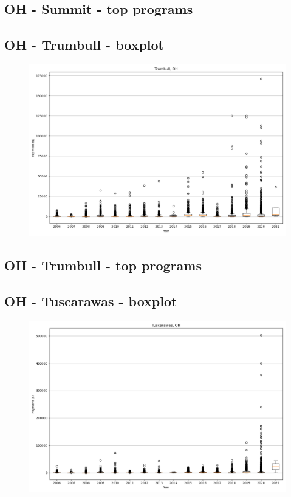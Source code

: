 \subsection*{OH - Summit - top programs}

\newpage
\subsection*{OH - Trumbull - boxplot}
\begin{figure}[h]
\centering
\includegraphics[width=7in]{../output/boxplots/counties/Trumbull-OH_boxplot.png}
\end{figure}


\subsection*{OH - Trumbull - top programs}

\newpage
\subsection*{OH - Tuscarawas - boxplot}
\begin{figure}[h]
\centering
\includegraphics[width=7in]{../output/boxplots/counties/Tuscarawas-OH_boxplot.png}
\end{figure}


